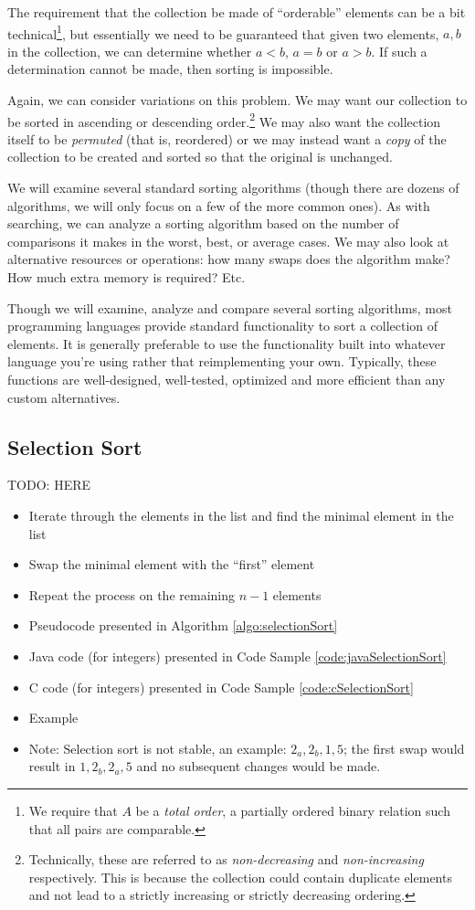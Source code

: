 The requirement that the collection be made of ``orderable'' elements can be
a bit technical\footnote{We require that $A$ be a \emph{total order}, a 
partially ordered binary relation such that all pairs are comparable.}, but essentially 
we need to be guaranteed that given two elements, $a, b$ in the collection, 
we can determine whether $a < b$, $a = b$ or $a > b$.  If such a determination
cannot be made, then sorting is impossible.

Again, we can consider variations on this problem.  We may want our collection
to be sorted in ascending or descending order.\footnote{Technically, these are
referred to as \emph{non-decreasing} and \emph{non-increasing} respectively.  
This is because the collection could contain duplicate elements and not lead
to a strictly increasing or strictly decreasing ordering.} We may also want
the collection itself to be \emph{permuted} (that is, reordered) or we may
instead want a \emph{copy} of the collection to be created and sorted so that
the original is unchanged.

We will examine several standard sorting algorithms (though there are dozens
of algorithms, we will only focus on a few of the more common ones).  As with 
searching, we can analyze a sorting algorithm based on the number of 
comparisons it makes in the worst, best, or average cases.  We may also look
at alternative resources or operations: how many swaps does the algorithm make?
How much extra memory is required?  Etc.

Though we will examine, analyze and compare several sorting algorithms, most
programming languages provide standard functionality to sort a collection of
elements.  It is generally preferable to use the functionality built into 
whatever language you're using rather that reimplementing your own.  Typically, 
these functions are well-designed, well-tested, optimized and more efficient
than any custom alternatives.

\subsection{Selection Sort}

TODO: HERE

\begin{itemize}
  \item Iterate through the elements in the list and find the minimal element in the list
  \item Swap the minimal element with the ``first'' element
  \item Repeat the process on the remaining $n-1$ elements
  \item Pseudocode presented in Algorithm \ref{algo:selectionSort}
  \item Java code (for integers) presented in Code Sample \ref{code:javaSelectionSort}
  \item C code (for integers) presented in Code Sample \ref{code:cSelectionSort}
  \item Example
  \item Note: Selection sort is not stable, an example: $2_a, 2_b, 1, 5$; the first swap would result in $1, 2_b, 2_a, 5$ and no subsequent changes would be made.
\end{itemize}

